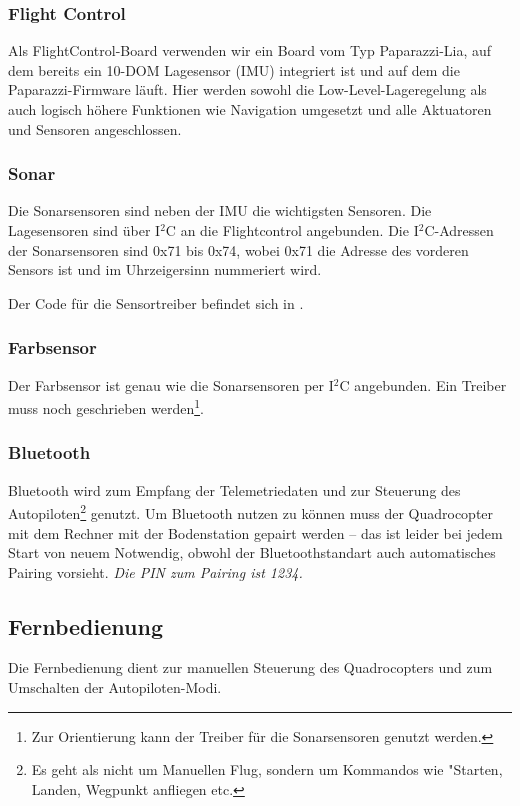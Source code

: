 \subsubsection{Flight Control}

Als FlightControl-Board verwenden wir ein Board vom Typ Paparazzi-Lia, auf dem bereits ein 10-DOM Lagesensor (IMU) integriert ist und auf dem die Paparazzi-Firmware läuft. Hier werden sowohl die Low-Level-Lageregelung als auch logisch höhere Funktionen wie Navigation umgesetzt und alle Aktuatoren und Sensoren angeschlossen.

\subsubsection{Sonar}
Die Sonarsensoren sind neben der IMU die wichtigsten Sensoren. Die Lagesensoren sind über I$^2$C an die Flightcontrol angebunden.
Die I$^2$C-Adressen der Sonarsensoren sind 0x71 bis 0x74, wobei 0x71 die Adresse des vorderen Sensors ist und im Uhrzeigersinn nummeriert wird.

Der Code für die Sensortreiber befindet sich in .

\subsubsection{Farbsensor}
Der Farbsensor ist genau wie die Sonarsensoren per I$^2$C angebunden. Ein Treiber muss noch geschrieben werden\footnote{Zur Orientierung kann der Treiber für die Sonarsensoren genutzt werden.}.


\subsubsection{Bluetooth}
Bluetooth wird zum Empfang der Telemetriedaten und zur Steuerung des Autopiloten\footnote{Es geht als nicht um Manuellen Flug, sondern um Kommandos wie "Starten, Landen, Wegpunkt anfliegen etc.} genutzt.
Um Bluetooth nutzen zu können muss der Quadrocopter mit dem Rechner mit der Bodenstation gepairt werden – das ist leider bei jedem Start von neuem Notwendig, obwohl der Bluetoothstandart auch automatisches Pairing vorsieht.
\emph{Die PIN zum Pairing ist 1234.}


\subsection{Fernbedienung}
Die Fernbedienung dient zur manuellen Steuerung des Quadrocopters und zum Umschalten der Autopiloten-Modi.

